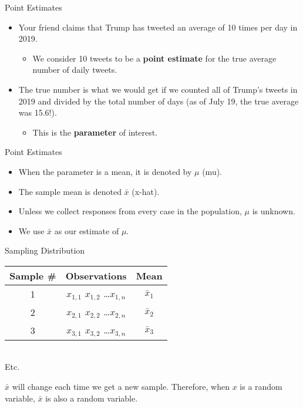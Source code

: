 \begin{frame}{Point Estimates}
    \begin{itemize}
        \item Your friend claims that Trump has tweeted an average of 10 times per day in 2019.
        \begin{itemize}
            \item We consider 10 tweets to be a \textbf{point estimate} for the true average number of daily tweets.
        \end{itemize}
        \item The true number is what we would get if we counted all of Trump's tweets in 2019 and divided by the total number of days (as of July 19, the true average was 15.6!). 
        \begin{itemize}
            \item This is the \textbf{parameter} of interest.
        \end{itemize}
    \end{itemize}
\end{frame}

\begin{frame}{Point Estimates}
    \begin{itemize}
        \item When the parameter is a mean, it is denoted by $\mu$ (mu).
        \item The sample mean is denoted $\bar{x}$ (x-hat). 
        \item Unless we collect responses from every case in the population, $\mu$ is unknown.
        \item We use $\bar{x}$ as our estimate of $\mu$. 
    \end{itemize}
\end{frame}

\begin{frame}{Sampling Distribution}
    \begin{tabular}{c|c|c}
        Sample \# & Observations & Mean  \\
        \hline
        1 & $x_{1,1}$ $x_{1,2}$ \dots $x_{1,n}$ & $\bar{x}_1$ \\
        2 & $x_{2,1}$ $x_{2,2}$ \dots $x_{2,n}$ & $\bar{x}_2$ \\
        3 & $x_{3,1}$ $x_{3,2}$ \dots $x_{3,n}$ & $\bar{x}_3$ \\
    \end{tabular}
    \\ Etc.
    
    \vspace{12pt}$\bar{x}$ will change each time we get a new sample. Therefore, when $x$ is a random variable, $\bar{x}$ is also a random variable. 
\end{frame}

